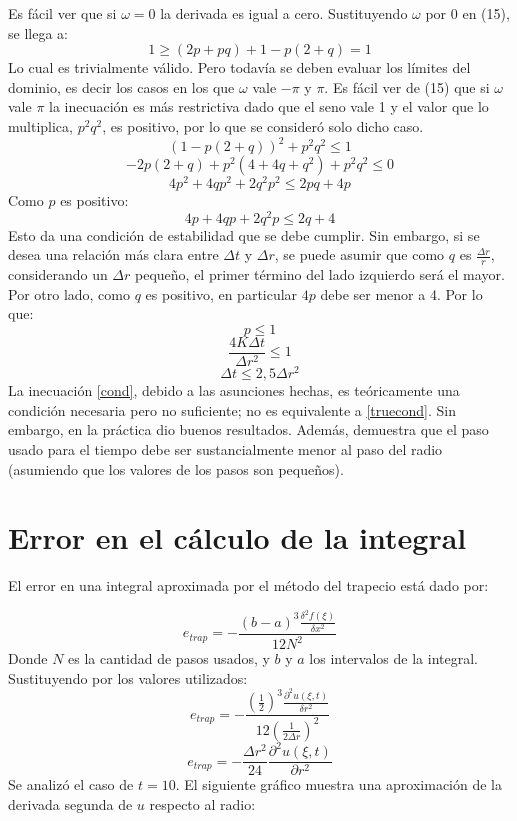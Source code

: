 ﻿\documentclass[%
final,
%
reprint,
%
notitlepage,
narroweqnarray,
inline,
twoside,
invited
]{ieee}
\begin{document}
Es fácil ver que si $\omega = 0$ la derivada es igual a cero. Sustituyendo $\omega$ por 0 en (15), se llega a:
\[
1 \geq  (2p+pq) + 1 - p(2+q) = 1
\]
Lo cual es trivialmente válido. Pero todavía se deben evaluar los límites del dominio, es decir los casos 
en los que $\omega$ vale $-\pi$ y $\pi$. Es fácil ver de (15) que si $\omega$ vale $\pi$ la inecuación 
es más restrictiva dado que el seno vale 1 y el valor que lo multiplica, $p^2q^2$, es positivo, por lo que 
se consideró solo dicho caso.
\[ 
(1-p(2+q))^2+p^2q^2 \leq 1
\]
\[ 
-2p(2+q)+p^2(4+4q+q^2)+p^2q^2 \leq 0
\]
\[ 
4p^2+4qp^2+2q^2p^2 \leq 2pq+4p
\]
Como $p$ es positivo:
\begin{equation}\label{truecond} 
4p+4qp+2q^2p \leq 2q+4
\end{equation}
Esto da una condición de estabilidad que se debe cumplir. Sin embargo, si se desea una relación más clara 
entre $\Delta t$ y $\Delta r$, se puede asumir que como $q$ es $\frac{\Delta r}{r}$, considerando un $\Delta r$ pequeño, 
el primer término del lado izquierdo será el mayor. Por otro lado, como $q$ es positivo, en particular $4p$ debe 
ser menor a 4. Por lo que:
\begin{equation}\label{p}
p \leq 1
\end{equation}
\[
\frac{4K\Delta t}{\Delta r^2} \leq 1
\]
\begin{equation}\label{cond}
\Delta t \leq 2,5\Delta r^2
\end{equation}
La inecuación \eqref{cond}, debido a las asunciones hechas, es teóricamente una condición necesaria pero no 
suficiente; no es equivalente a \eqref{truecond}. Sin embargo, en la práctica dio buenos resultados. Además, 
demuestra que el paso usado para el tiempo debe ser sustancialmente 
menor al paso del radio (asumiendo que los valores de los pasos son pequeños).

\section{Error en el cálculo de la integral}

El error en una integral aproximada por el método del trapecio está dado por:

\begin{equation}
e_{trap} = - \frac{(b-a)^3\frac{\delta^2f(\xi)}{\delta x^2}}{12N^2}
\end{equation}
Donde $N$ es la cantidad de pasos usados, y $b$ y $a$ los intervalos de la integral. Sustituyendo 
por los valores utilizados:
\[
e_{trap} = - \frac{(\frac{1}{2})^3\frac{\partial^2u(\xi,t)}{\delta r^2}}{12(\frac{1}{2\Delta r})^2}
\]
\[
e_{trap} = -\frac{\Delta r^2}{24}\frac{\partial^2u(\xi,t)}{\partial r^2}
\]
Se analizó el caso de $t=10$. El siguiente gráfico muestra una aproximación de la derivada segunda de $u$ respecto 
al radio:
\end{document}
